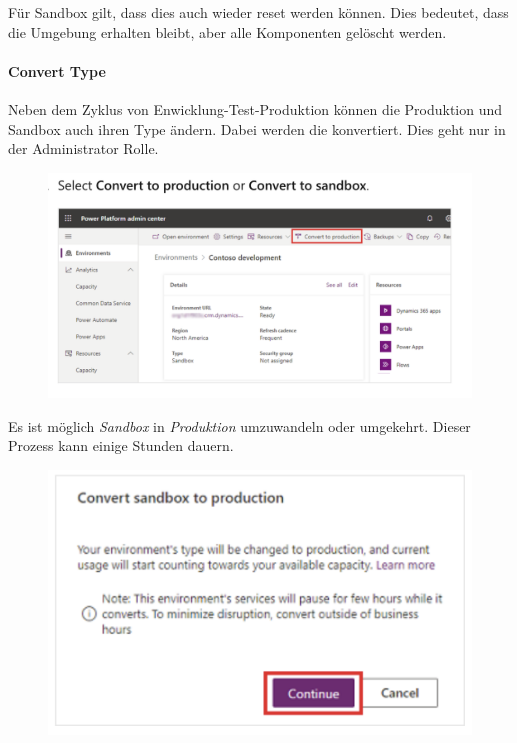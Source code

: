 Für Sandbox \Env gilt, dass dies auch wieder reset werden können. Dies bedeutet, dass die Umgebung erhalten bleibt, aber alle Komponenten gelöscht werden.

\paragraph*{Convert \Env Type}
 Neben dem Zyklus von Enwicklung-Test-Produktion können die \Env Produktion und Sandbox auch ihren Type ändern. Dabei werden die \Env konvertiert. Dies geht nur in der Administrator Rolle.
\begin{figure}[H]
	\centering
	\includegraphics[scale = 0.3]{attachment/chapter_13/Scc022}
\end{figure}
Es ist möglich \textit{Sandbox} in \textit{Produktion} umzuwandeln oder umgekehrt.
Dieser Prozess kann einige Stunden dauern.
\begin{figure}[H]
	\centering
	\includegraphics[scale = 0.3]{attachment/chapter_13/Scc023}
\end{figure}

